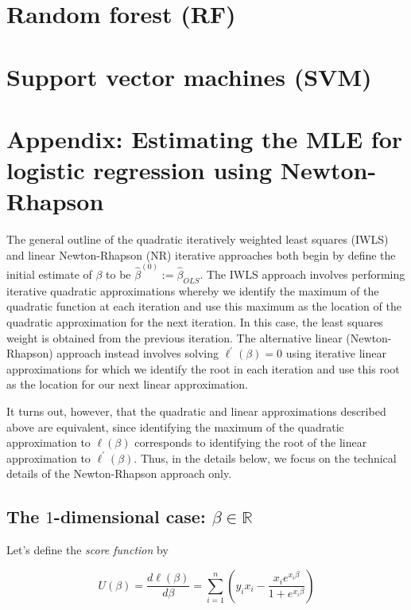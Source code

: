 \section{Random forest (RF)}




\section{Support vector machines (SVM)}




\section{Appendix: Estimating the MLE for logistic regression using Newton-Rhapson}


The general outline of the quadratic iteratively weighted least squares (IWLS) and linear Newton-Rhapson (NR) iterative approaches both begin by define the initial estimate of $\beta$ to be $\hat{\beta}^{(0)} := \hat{\beta}_{OLS}$. The IWLS approach involves performing iterative quadratic approximations whereby we identify the maximum of the quadratic function at each iteration and use this maximum as the location of the quadratic approximation for the next iteration. In this case, the least squares weight is obtained from the previous iteration. The alternative linear (Newton-Rhapson) approach instead involves solving $\ell^\prime(\beta) = 0$ using iterative linear approximations for which we identify the root in each iteration and use this root as the location for our next linear approximation.

It turns out, however, that the quadratic and linear approximations described above are equivalent, since identifying the maximum of the quadratic approximation to $\ell(\beta)$ corresponds to identifying the root of the linear approximation to $\ell^\prime(\beta)$. Thus, in the details below, we focus on the technical details of the Newton-Rhapson approach only.


\subsection*{The $1$-dimensional case: $\beta \in \mathbb{R}$}

Let's define the \textit{score function} by

$$U(\beta) = \frac{d \ell(\beta)}{d \beta} = \sum_{i=1}^n \left( y_i x_i - \frac{x_i e^{x_i \beta}}{1 + e^{x_i \beta}}\right)$$


